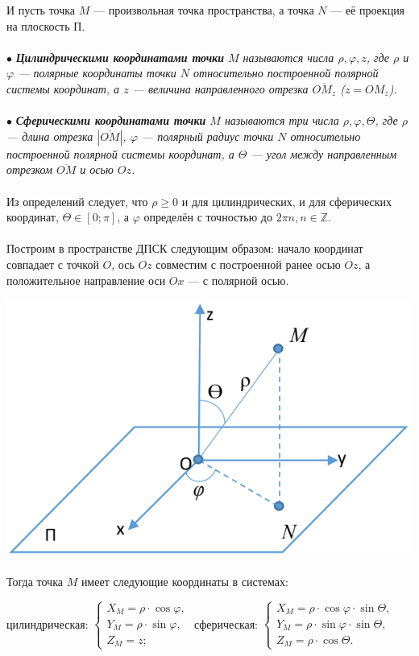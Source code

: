 И пусть точка $M$ --- произвольная точка пространства, а точка $N$ --- её проекция на плоскость П.\\\\
$\bullet$ \textit{\textbf{Цилиндрическими координатами точки} $M$ называются числа $\rho, \varphi, z$, где $\rho$ и $\varphi$ --- полярные координаты точки $N$ относительно построенной полярной системы координат, а $z$ --- величина направленного отрезка $\overline{OM_z}$ ($z = OM_z$)}.\\\\
$\bullet$ \textit{\textbf{Сферическими координатами точки} $M$ называются три числа $\rho, \varphi, \Theta$, где $\rho$ --- длина отрезка $|\overline{OM}|$, $\varphi$ --- полярный радиус точки $N$ относительно построенной полярной системы координат, а $\Theta$ --- угол между направленным отрезком $\overline{OM}$ и осью $Oz$.}\\\\
Из определений следует, что $\rho\geqslant0$ и для цилиндрических, и для сферических координат, $\Theta\in [0;\pi]$, а $\varphi$ определён с точностью до $2\pi n, n\in \mathbb{Z}$.\\\\
Построим в пространстве ДПСК следующим образом: начало координат совпадает с точкой $O$, ось $Oz$ совместим с построенной ранее осью $Oz$, а положительное направление оси $Ox$ --- с полярной осью. \begin{center}
	\includegraphics[scale=0.3]{images/pcsk_2.png}
\end{center}
Тогда точка $M$ имеет следующие координаты в системах:\begin{center}
	цилиндрическая: $\begin{cases}
		X_M = \rho\cdot \cos\varphi,\\
		Y_M = \rho\cdot \sin\varphi,\\
		Z_M = z;
	\end{cases}$ сферическая: $\begin{cases}
		X_M = \rho\cdot \cos\varphi\cdot \sin\Theta,\\
		Y_M = \rho\cdot \sin\varphi\cdot \sin\Theta,\\
		Z_M = \rho\cdot \cos\Theta.
	\end{cases}$
\end{center}

